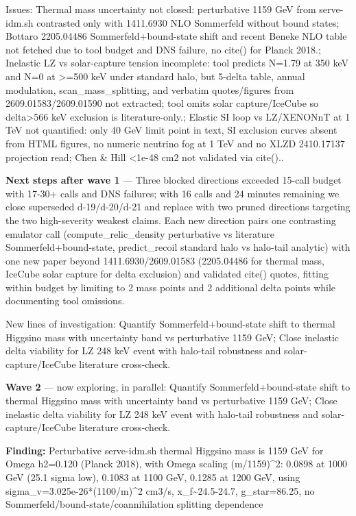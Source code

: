 \documentclass[11pt,a4paper]{article}
\begin{document}
Issues: Thermal mass uncertainty not closed: perturbative 1159 GeV from serve-idm.sh contrasted only with 1411.6930 NLO Sommerfeld without bound states; Bottaro 2205.04486 Sommerfeld+bound-state shift and recent Beneke NLO table not fetched due to tool budget and DNS failure, no cite() for Planck 2018.; Inelastic LZ vs solar-capture tension incomplete: tool predicts N=1.79 at 350 keV and N=0 at \textgreater{}=500 keV under standard halo, but 5-delta table, annual modulation, scan\_mass\_splitting, and verbatim quotes/figures from 2609.01583/2609.01590 not extracted; tool omits solar capture/IceCube so delta\textgreater{}566 keV exclusion is literature-only.; Elastic SI loop vs LZ/XENONnT at 1 TeV not quantified: only 40 GeV limit point in text, SI exclusion curves absent from HTML figures, no numeric neutrino fog at 1 TeV and no XLZD 2410.17137 projection read; Chen \& Hill \textless{}1e-48 cm2 not validated via cite()..

\textbf{Next steps after wave 1} --- Three blocked directions exceeded 15-call budget with 17-30+ calls and DNS failures; with 16 calls and 24 minutes remaining we close superseded d-19/d-20/d-21 and replace with two pruned directions targeting the two high-severity weakest claims. Each new direction pairs one contrasting emulator call (compute\_relic\_density perturbative vs literature Sommerfeld+bound-state, predict\_recoil standard halo vs halo-tail analytic) with one new paper beyond 1411.6930/2609.01583 (2205.04486 for thermal mass, IceCube solar capture for delta exclusion) and validated cite() quotes, fitting within budget by limiting to 2 mass points and 2 additional delta points while documenting tool omissions.

New lines of investigation: Quantify Sommerfeld+bound-state shift to thermal Higgsino mass with uncertainty band vs perturbative 1159 GeV; Close inelastic delta viability for LZ 248 keV event with halo-tail robustness and solar-capture/IceCube literature cross-check.

\textbf{Wave 2} --- now exploring, in parallel: Quantify Sommerfeld+bound-state shift to thermal Higgsino mass with uncertainty band vs perturbative 1159 GeV; Close inelastic delta viability for LZ 248 keV event with halo-tail robustness and solar-capture/IceCube literature cross-check.

\textbf{Finding:} Perturbative serve-idm.sh thermal Higgsino mass is 1159 GeV for Omega h2=0.120 (Planck 2018), with Omega scaling (m/1159)\textasciicircum{}2: 0.0898 at 1000 GeV (25.1 sigma low), 0.1083 at 1100 GeV, 0.1285 at 1200 GeV, using sigma\_v=3.025e-26*(1100/m)\textasciicircum{}2 cm3/s, x\_f\textasciitilde{}24.5-24.7, g\_star=86.25, no Sommerfeld/bound-state/coannihilation splitting dependence
\end{document}
